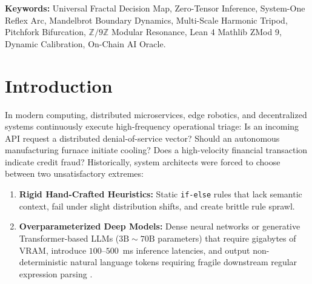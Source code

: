 \documentclass[10pt,journal,compsoc,twocolumn]{article}
\begin{document}
\vspace{0.2cm}
\noindent\textbf{Keywords:} Universal Fractal Decision Map, Zero-Tensor Inference, System-One Reflex Arc, Mandelbrot Boundary Dynamics, Multi-Scale Harmonic Tripod, Pitchfork Bifurcation, $\mathbb{Z}/9\mathbb{Z}$ Modular Resonance, Lean 4 Mathlib ZMod 9, Dynamic Calibration, On-Chain AI Oracle.


\section{Introduction}

In modern computing, distributed microservices, edge robotics, and decentralized systems continuously execute high-frequency operational triage: Is an incoming API request a distributed denial-of-service vector? Should an autonomous manufacturing furnace initiate cooling? Does a high-velocity financial transaction indicate credit fraud? Historically, system architects were forced to choose between two unsatisfactory extremes:
\begin{enumerate}
    \item \textbf{Rigid Hand-Crafted Heuristics:} Static \texttt{if-else} rules that lack semantic context, fail under slight distribution shifts, and create brittle rule sprawl.
    \item \textbf{Overparameterized Deep Models:} Dense neural networks or generative Transformer-based LLMs ($3\text{B}\sim 70\text{B}$ parameters) that require gigabytes of VRAM, introduce $100\text{--}500$~ms inference latencies, and output non-deterministic natural language tokens requiring fragile downstream regular expression parsing \cite{vaswani2017attention, touvron2023llama}.
\end{enumerate}
\end{document}
